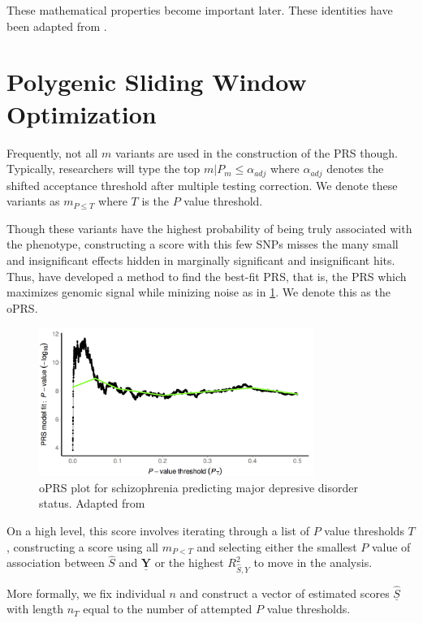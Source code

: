 These mathematical properties become important later. These identities have been adapted from \cite{Dudbridge2013}.

\section{Polygenic Sliding Window Optimization}

Frequently, not all $m$ variants are used in the construction of the \ac{PRS} though. Typically, researchers will type the top $m | P_m \leq \alpha_{adj}$ where $\alpha_{adj}$ denotes the shifted acceptance threshold after multiple testing correction. We denote these variants as $m_{P \leq T}$ where $T$ is the $P$ value threshold. 

Though these variants have the highest probability of being truly associated with the phenotype, constructing a score with this few \ac{SNP}s misses the many small and insignificant effects hidden in marginally significant and insignificant hits. Thus, \cite{Euesden2014} have developed a method to find the best-fit \ac{PRS}, that is, the PRS which maximizes genomic signal while minizing noise as in \ref{pt}. We denote this as the \ac{oPRS}. 

\begin{figure}[h]
\label{pt}
\caption{\ac{oPRS} plot for schizophrenia predicting major depresive disorder status. Adapted from \cite{Euesden2014}}
\centering
\includegraphics[width=0.8\textwidth]{Figures/pt.png}
\end{figure}

On a high level, this score involves iterating through a list of $P$ value thresholds $T$, constructing a score using all $m_{P < T}$ and selecting either the smallest $P$ value of association between $\hat{S}$ and $\underline{\mathbf{Y}}$ or the highest $R^2_{\hat{S}, Y}$ to move in the analysis. 

More formally, we fix individual $n$ and construct a vector of estimated scores $\underline{\hat{S}}$ with length $n_T$ equal to the number of attempted $P$ value thresholds. 

